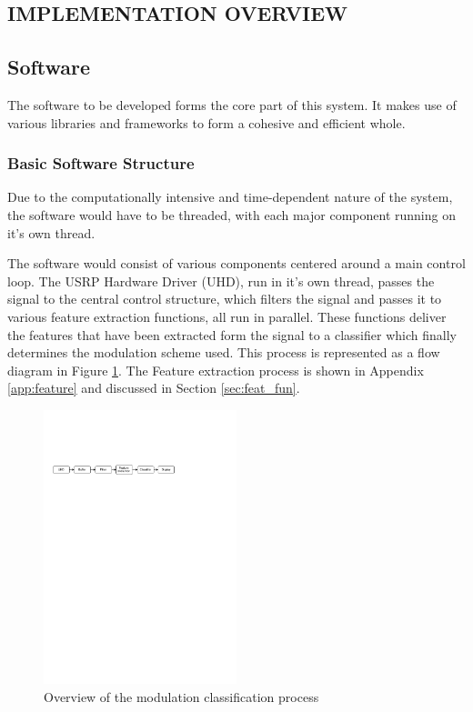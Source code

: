 \documentclass[10pt,onecolumn]{witseiepaper}
\begin{document}
\begin{multicols}{2}
\section{IMPLEMENTATION OVERVIEW}

	\subsection{Software}
		The software to be developed forms the core part of this system. It makes use of various libraries and frameworks to form a cohesive and efficient whole. 

		\subsubsection{Basic Software Structure}
			Due to the computationally intensive and time-dependent nature of the system, the software would have to be threaded, with each major component running on it's own thread.

			The software would consist of various components centered around a main control loop. The USRP Hardware Driver (UHD), run in it's own thread, passes the signal to the central control structure, which filters the signal and passes it to various feature extraction functions, all run in parallel. These functions deliver the features that have been extracted form the signal to a classifier which finally determines the modulation scheme used. This process is represented as a flow diagram in Figure \ref{fig:sw_overview}. The Feature extraction process is shown in Appendix \ref{app:feature} and discussed in Section \ref{sec:feat_fun}.

			\begin{figure}[h!]
				\centering
				\includegraphics[trim=1.2cm 31.5cm 9cm 8cm, clip=true,width=0.5\textwidth]{small.pdf}
				\caption{Overview of the modulation classification process}
				\label{fig:sw_overview}
			\end{figure}


\end{multicols}
\end{document}
